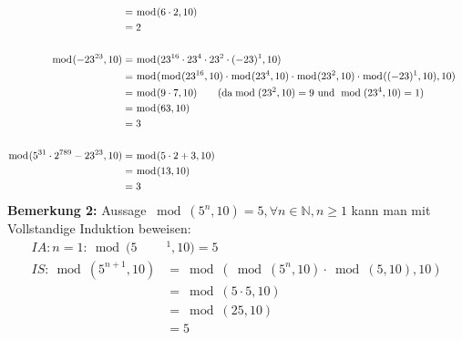 \begin{enumerate}[label=(\alph*)]
\begin{align*}
			\\&= \bmod(6\cdot2,10) 
			\\&= 2 \\\\
			\bmod(-23^{23},10) &= \bmod(23^{16}\cdot23^{4}\cdot23^{2}\cdot(-23)^1,10) 
			\\&= \bmod(\bmod(23^{16},10)\cdot\bmod(23^{4},10)\cdot\bmod(23^{2},10)\cdot\bmod((-23)^1,10),10)
			\\&= \bmod(9\cdot 7, 10) \textrm{\qquad (da} \bmod(23^2,10)=9 \textrm{ und }\bmod(23^4,10)=1)
			\\&= \bmod(63,10) 
			\\&= 3 \\\\
			\bmod(5^{31} \cdot 2^{789}-23^{23}, 10) &= \bmod(5 \cdot 2 + 3,10)	
			\\&= \bmod(13,10) 
			\\&= 3
		\end{align*}
		\textbf{Bemerkung 2:} Aussage $\bmod(5^n,10)=5, \forall n \in \mathbb{N}, n\geq1$ kann man mit Vollstandige Induktion beweisen:
		\begin{align*}
			IA: n=1: \bmod(5&^1,10)=5 \\ %
			IS: \bmod(5^{n+1},10)&=\bmod(\bmod(5^n,10)\cdot\bmod(5,10),10) \\&= \bmod(5\cdot5,10) \\&= \bmod(25,10) \\&= 5
		\end{align*}


\end{enumerate}
